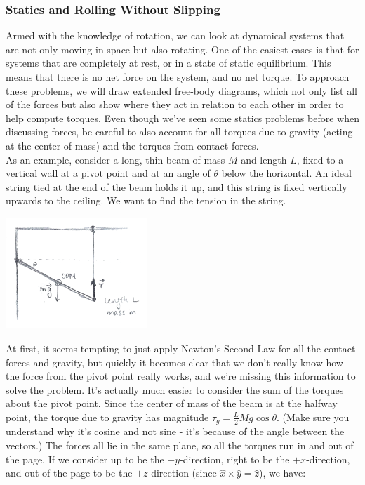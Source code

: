 \subsubsection{Statics and Rolling Without Slipping}
Armed with the knowledge of rotation, we can look at dynamical systems that are not only moving in space but also rotating. One of the easiest cases is that for systems that are completely at rest, or in a state of static equilibrium. This means that there is no net force on the system, and no net torque. To approach these problems, we will draw extended free-body diagrams, which not only list all of the forces but also show where they act in relation to each other in order to help compute torques. Even though we've seen some statics problems before when discussing forces, be careful to also account for all torques due to gravity (acting at the center of mass) and the torques from contact forces.\\
As an example, consider a long, thin beam of mass $M$ and length $L$, fixed to a vertical wall at a pivot point and at an angle of $\theta$ below the horizontal. An ideal string tied at the end of the beam holds it up, and this string is fixed vertically upwards to the ceiling. We want to find the tension in the string. \\
\begin{center}
	\includegraphics[width=0.4\textwidth]{images/mechintro/statics.png}\\
\end{center}
At first, it seems tempting to just apply Newton's Second Law for all the contact forces and gravity, but quickly it becomes clear that we don't really know how the force from the pivot point really works, and we're missing this information to solve the problem. It's actually much easier to consider the sum of the torques about the pivot point. Since the center of mass of the beam is at the halfway point, the torque due to gravity has magnitude $\tau_g = \frac{L}{2}Mg\cos \theta$. (Make sure you understand why it's cosine and not sine - it's because of the angle between the vectors.) The forces all lie in the same plane, so all the torques run in and out of the page. If we consider up to be the $+y$-direction, right to be the $+x$-direction, and out of the page to be the $+z$-direction (since $\hat x \times \hat y = \hat z$), we have: 
